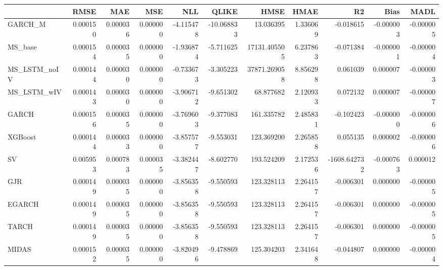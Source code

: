 \begin{tabular}{lrrrrrrrrrr}
\toprule
 & RMSE & MAE & MSE & NLL & QLIKE & HMSE & HMAE & R2 & Bias & MADL \\
\midrule
GARCH_M & 0.000150 & 0.000036 & 0.000000 & -4.115478 & -10.068833 & 13.036395 & 1.336069 & -0.018615 & -0.000003 & -0.000005 \\
MS_base & 0.000154 & 0.000035 & 0.000000 & -1.936874 & -5.711625 & 17131.405505 & 6.237863 & -0.071384 & -0.000001 & -0.000004 \\
MS_LSTM_noIV & 0.000144 & 0.000030 & 0.000000 & -0.733673 & -3.305223 & 37871.269058 & 8.856298 & 0.061039 & 0.000007 & -0.000003 \\
MS_LSTM_wIV & 0.000143 & 0.000030 & 0.000000 & -3.906712 & -9.651302 & 68.877682 & 2.120933 & 0.072132 & 0.000007 & -0.000007 \\
GARCH & 0.000156 & 0.000035 & 0.000000 & -3.769603 & -9.377083 & 161.335782 & 2.485831 & -0.102423 & -0.000000 & -0.000006 \\
XGBoost & 0.000144 & 0.000033 & 0.000000 & -3.857577 & -9.553031 & 123.369200 & 2.265858 & 0.055135 & 0.000002 & -0.000006 \\
SV & 0.005953 & 0.000783 & 0.000035 & -3.382447 & -8.602770 & 193.524209 & 2.172536 & -1608.642732 & -0.000763 & 0.000012 \\
GJR & 0.000149 & 0.000035 & 0.000000 & -3.856358 & -9.550593 & 123.328113 & 2.264157 & -0.006301 & 0.000000 & -0.000005 \\
EGARCH & 0.000149 & 0.000035 & 0.000000 & -3.856358 & -9.550593 & 123.328113 & 2.264157 & -0.006301 & 0.000000 & -0.000005 \\
TARCH & 0.000149 & 0.000035 & 0.000000 & -3.856358 & -9.550593 & 123.328113 & 2.264157 & -0.006301 & 0.000000 & -0.000005 \\
MIDAS & 0.000152 & 0.000035 & 0.000000 & -3.820496 & -9.478869 & 125.304203 & 2.341648 & -0.044807 & 0.000000 & -0.000004 \\
\bottomrule
\end{tabular}
